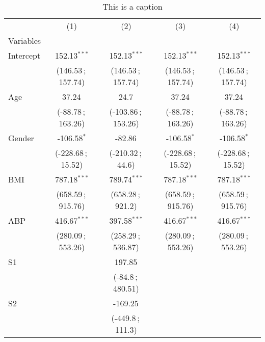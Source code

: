 \begin{table}
\centering
\caption{This is a caption}
\begin{tabular}{lS[table-format =4.2]S[table-format =4.2]S[table-format =4.2]S[table-format =4.2]}
\toprule
   &                  {(1)} &                   {(2)} &                  {(3)} &                  {(4)} \\
Variables &                        &                         &                        &                        \\
\midrule
Intercept &        152.13$^{*** }$ &         152.13$^{*** }$ &        152.13$^{*** }$ &        152.13$^{*** }$ \\
   &  {(146.53\,;\,157.74)} &   {(146.53\,;\,157.74)} &  {(146.53\,;\,157.74)} &  {(146.53\,;\,157.74)} \\
Age &            37.24$^{ }$ &              24.7$^{ }$ &            37.24$^{ }$ &            37.24$^{ }$ \\
   &  {(-88.78\,;\,163.26)} &  {(-103.86\,;\,153.26)} &  {(-88.78\,;\,163.26)} &  {(-88.78\,;\,163.26)} \\
Gender &         -106.58$^{* }$ &            -82.86$^{ }$ &         -106.58$^{* }$ &         -106.58$^{* }$ \\
   &  {(-228.68\,;\,15.52)} &    {(-210.32\,;\,44.6)} &  {(-228.68\,;\,15.52)} &  {(-228.68\,;\,15.52)} \\
BMI &        787.18$^{*** }$ &         789.74$^{*** }$ &        787.18$^{*** }$ &        787.18$^{*** }$ \\
   &  {(658.59\,;\,915.76)} &    {(658.28\,;\,921.2)} &  {(658.59\,;\,915.76)} &  {(658.59\,;\,915.76)} \\
ABP &        416.67$^{*** }$ &         397.58$^{*** }$ &        416.67$^{*** }$ &        416.67$^{*** }$ \\
   &  {(280.09\,;\,553.26)} &   {(258.29\,;\,536.87)} &  {(280.09\,;\,553.26)} &  {(280.09\,;\,553.26)} \\
S1 &                        &            197.85$^{ }$ &                        &                        \\
   &                        &    {(-84.8\,;\,480.51)} &                        &                        \\
S2 &                        &           -169.25$^{ }$ &                        &                        \\
   &                        &    {(-449.8\,;\,111.3)} &                        &                        \\

\end{tabular}
\end{table}
